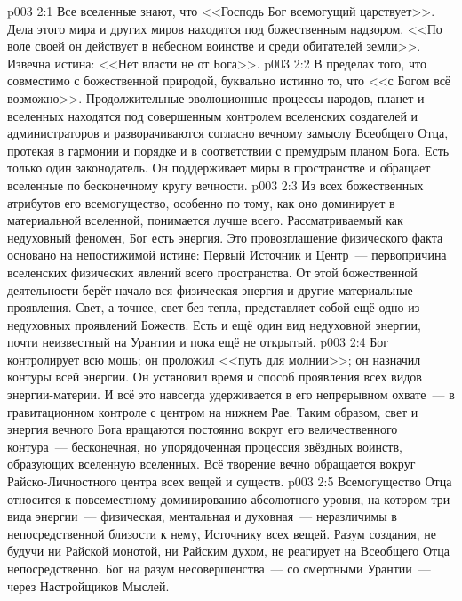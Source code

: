 \vs p003 2:1 Все вселенные знают, что <<Господь Бог всемогущий царствует>>. Дела этого мира и других миров находятся под божественным надзором. <<По воле своей он действует в небесном воинстве и среди обитателей земли>>. Извечна истина: <<Нет власти не от Бога>>.
\vs p003 2:2 В пределах того, что совместимо с божественной природой, буквально истинно то, что <<с Богом всё возможно>>. Продолжительные эволюционные процессы народов, планет и вселенных находятся под совершенным контролем вселенских создателей и администраторов и разворачиваются согласно вечному замыслу Всеобщего Отца, протекая в гармонии и порядке и в соответствии с премудрым планом Бога. Есть только один законодатель. Он поддерживает миры в пространстве и обращает вселенные по бесконечному кругу вечности.
\vs p003 2:3 Из всех божественных атрибутов его всемогущество, особенно по тому, как оно доминирует в материальной вселенной, понимается лучше всего. Рассматриваемый как недуховный феномен, Бог есть энергия. Это провозглашение физического факта основано на непостижимой истине: Первый Источник и Центр~--- первопричина вселенских физических явлений всего пространства. От этой божественной деятельности берёт начало вся физическая энергия и другие материальные проявления. Свет, а точнее, свет без тепла, представляет собой ещё одно из недуховных проявлений Божеств. Есть и ещё один вид недуховной энергии, почти неизвестный на Урантии и пока ещё не открытый.
\vs p003 2:4 Бог контролирует всю мощь; он проложил <<путь для молнии>>; он назначил контуры всей энергии. Он установил время и способ проявления всех видов энергии\hyp{}материи. И всё это навсегда удерживается в его непрерывном охвате~--- в гравитационном контроле с центром на нижнем Рае. Таким образом, свет и энергия вечного Бога вращаются постоянно вокруг его величественного контура~--- бесконечная, но упорядоченная процессия звёздных воинств, образующих вселенную вселенных. Всё творение вечно обращается вокруг Райско\hyp{}Личностного центра всех вещей и существ.
\vs p003 2:5 Всемогущество Отца относится к повсеместному доминированию абсолютного уровня, на котором три вида энергии~--- физическая, ментальная и духовная~--- неразличимы в непосредственной близости к нему, Источнику всех вещей. Разум создания, не будучи ни Райской монотой, ни Райским духом, не реагирует на Всеобщего Отца непосредственно. Бог  на разум несовершенства~--- со смертными Урантии~--- через Настройщиков Мыслей.
